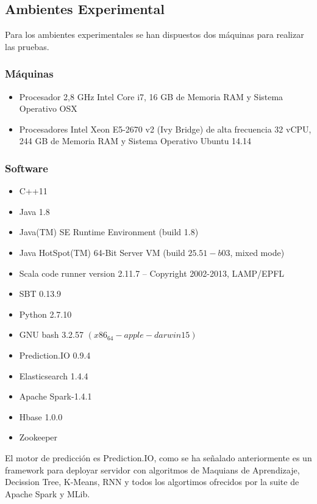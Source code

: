 \subsection{Ambientes Experimental}

Para los ambientes experimentales se han dispuestos dos máquinas para realizar las pruebas. 

\subsubsection{Máquinas}
	\begin{itemize}
		\item Procesador 2,8 GHz Intel Core i7, 16 GB de Memoria RAM y Sistema Operativo OSX
		\item Procesadores Intel Xeon E5-2670 v2 (Ivy Bridge) de alta frecuencia 32 vCPU, 244 GB de Memoria RAM y Sistema Operativo Ubuntu 14.14 
	\end{itemize}

\subsubsection{Software}

	\begin{itemize}
		\item C++11
		\item Java  1.8
		\item Java(TM) SE Runtime Environment (build 1.8)
		\item Java HotSpot(TM) 64-Bit Server VM (build $25.51-b03$, mixed mode)
		\item Scala code runner version 2.11.7 -- Copyright 2002-2013, LAMP/EPFL
		\item SBT 0.13.9 
		\item Python 2.7.10
		\item GNU bash 3.2.57 $(x86_64-apple-darwin15)$
		\item Prediction.IO 0.9.4
		\item Elasticsearch 1.4.4	
		\item Apache Spark-1.4.1
		\item Hbase 1.0.0
		\item Zookeeper 
	\end{itemize}









El motor de predicción es Prediction.IO, como se ha señalado anteriormente  es un framework para deployar servidor con algoritmos de Maquians de Aprendizaje, Decission Tree, K-Means, RNN y todos los algortimos ofrecidos por la suite de Apache Spark y MLib. %


